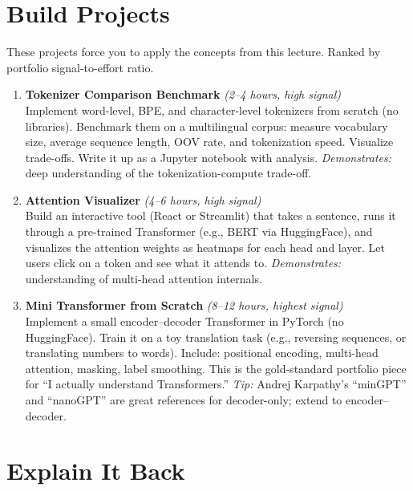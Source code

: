 \documentclass[11pt, a4paper]{article}
\begin{document}
\newpage
\section{Build Projects}

These projects force you to apply the concepts from this lecture. Ranked by portfolio signal-to-effort ratio.

\begin{enumerate}[leftmargin=2em]
  \item \textbf{Tokenizer Comparison Benchmark} \textit{(2--4 hours, high signal)}\\
  Implement word-level, BPE, and character-level tokenizers from scratch (no libraries). Benchmark them on a multilingual corpus: measure vocabulary size, average sequence length, OOV rate, and tokenization speed. Visualize trade-offs. Write it up as a Jupyter notebook with analysis. \emph{Demonstrates:} deep understanding of the tokenization-compute trade-off.

  \item \textbf{Attention Visualizer} \textit{(4--6 hours, high signal)}\\
  Build an interactive tool (React or Streamlit) that takes a sentence, runs it through a pre-trained Transformer (e.g., BERT via HuggingFace), and visualizes the attention weights as heatmaps for each head and layer. Let users click on a token and see what it attends to. \emph{Demonstrates:} understanding of multi-head attention internals.

  \item \textbf{Mini Transformer from Scratch} \textit{(8--12 hours, highest signal)}\\
  Implement a small encoder--decoder Transformer in PyTorch (no HuggingFace). Train it on a toy translation task (e.g., reversing sequences, or translating numbers to words). Include: positional encoding, multi-head attention, masking, label smoothing. This is the gold-standard portfolio piece for ``I actually understand Transformers.'' \emph{Tip:} Andrej Karpathy's ``minGPT'' and ``nanoGPT'' are great references for decoder-only; extend to encoder--decoder.
\end{enumerate}

\newpage
\section{Explain It Back}
\end{document}
